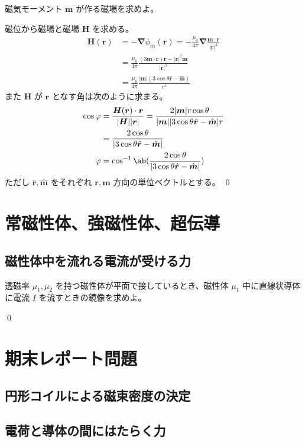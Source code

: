 \documentclass[uplatex,dvipdfmx,a4paper,11pt]{jlreq}
\makeatletter
\newcommand{\HH}{\bm{H}}
\newcommand{\rr}{\bm{r}}
\newcommand{\mm}{\bm{m}}
\newcommand{\vnabla}{\mathbf{\nabla}}
\theoremstyle{definition}
\renewenvironment{proof}[1][\proofname]{\par
  \normalfont
  \topsep6\p@\@plus6\p@ \trivlist
  \item[\hskip\labelsep{\bfseries #1}\@addpunct{\bfseries}]\ignorespaces\quad\par
}{%
  \qed\endtrivlist\@endpefalse
}
\renewcommand\proofname{証明}
\makeatother
\begin{document}
\begin{problem}
磁気モーメント $\bm{m}$ が作る磁場を求めよ。
\end{problem}
\begin{proof}
  磁位から磁場と磁場 $\HH$ を求める。
  \begin{align}
    \HH(\rr) & = -\vnabla\phi_m(\rr) = -\frac{\mu_0}{4\pi}\vnabla\frac{\mm\cdot\rr}{|\rr|^3} \\
             & = \frac{\mu_0}{4\pi}\frac{(3\mm\cdot\rr)\rr - |\rr|^2\mm}{|\rr|^5}            \\
             & = \frac{\mu_0}{4\pi}\frac{|\mm|(3\cos\theta\hat{\rr} - \hat{\mm})}{r^3}
  \end{align}
  また $\HH$ が $\rr$ となす角は次のように求まる。
  \begin{align}
    \cos\varphi & = \frac{\HH(\rr)\cdot\rr}{|\HH||\rr|} = \frac{2|\mm|r\cos\theta}{|\mm||3\cos\theta\hat{\rr} - \hat{\mm}|r} \\
                & = \frac{2\cos\theta}{|3\cos\theta\hat{\rr} - \hat{\mm}|}                                                   \\
    \varphi     & = \cos^{-1}\ab(\frac{2\cos\theta}{|3\cos\theta\hat{\rr} - \hat{\mm}|})
  \end{align}
  ただし $\hat{\rr}, \hat{\mm}$ をそれぞれ $\rr, \mm$ 方向の単位ベクトルとする。
\end{proof}


\section{常磁性体、強磁性体、超伝導}
\subsection{磁性体中を流れる電流が受ける力}
\begin{problem}
透磁率 $\mu_1, \mu_2$ を持つ磁性体が平面で接しているとき、磁性体 $\mu_1$ 中に直線状導体に電流 $I$ を流すときの鏡像を求めよ。
\end{problem}
\begin{proof}

\end{proof}

\setcounter{section}{8}
\section{期末レポート問題}
\subsection{円形コイルによる磁束密度の決定}

\subsection{電荷と導体の間にはたらく力}
\end{document}

